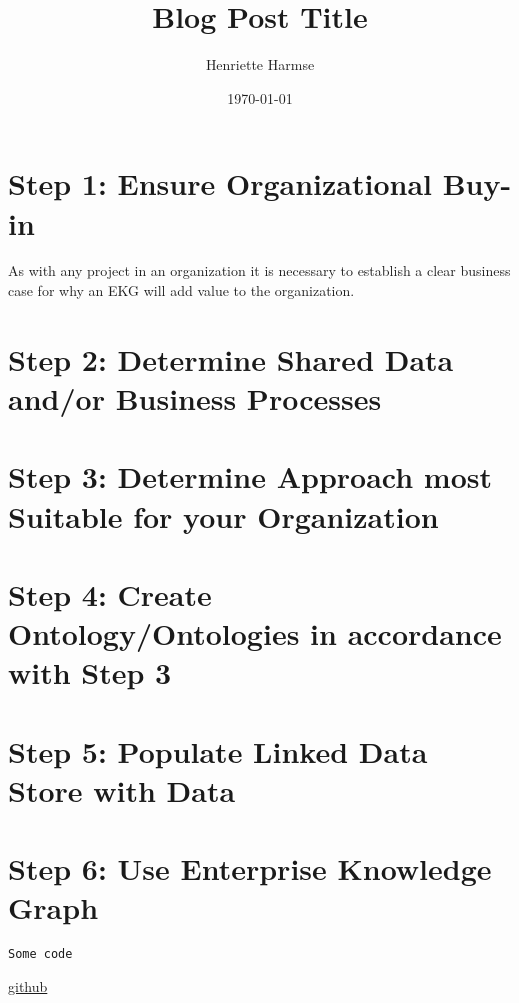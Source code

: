 \documentclass{amsart}
\title{Blog Post Title}
\author{Henriette Harmse}
\date{\today}
\begin{document}
  \maketitle
  
  
  \section{Step 1: Ensure Organizational Buy-in}
  As with any project in an organization it is necessary to establish a clear business case for why an EKG will add value to the organization.
  
  \section{Step 2: Determine Shared Data and/or Business Processes}
  
  \section{Step 3: Determine Approach most Suitable for your Organization}
  
  \section{Step 4: Create Ontology/Ontologies in accordance with Step 3}
  
  \section{Step 5: Populate Linked Data Store with Data}
  
  \section{Step 6: Use Enterprise Knowledge Graph}  
  
  
  \cite{Aameri2015}

\begin{small}
\begin{verbatim} 
Some code
\end{verbatim}
\end{small}

\href{http://}{github}
  
  
  
 
\end{document}
